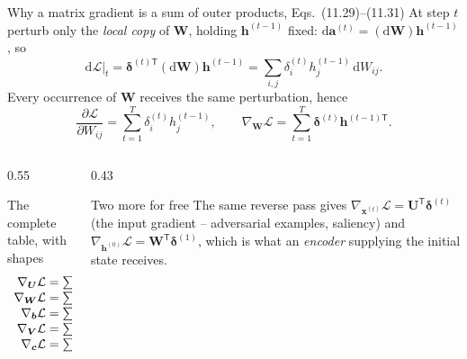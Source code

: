 \documentclass[10pt,aspectratio=169]{beamer}
\begin{document}
\begin{frame}{Why a matrix gradient is a sum of outer products, Eqs.~(11.29)--(11.31)}
\small
At step $t$ perturb only the \emph{local copy} of $\bm{W}$, holding
$\bm{h}^{(t-1)}$ fixed:
$\mathrm{d}\bm{a}^{(t)}=(\mathrm{d}\bm{W})\bm{h}^{(t-1)}$, so
\[
  \mathrm{d}\mathcal{L}\big|_{t}
  =\bm{\delta}^{(t)\mathsf{T}}(\mathrm{d}\bm{W})\bm{h}^{(t-1)}
  =\sum_{i,j}\delta^{(t)}_ih^{(t-1)}_j\,\mathrm{d}W_{ij}.
\]
Every occurrence of $\bm{W}$ receives the same perturbation, hence
\[
  \boxed{\;\frac{\partial\mathcal{L}}{\partial W_{ij}}=\sum_{t=1}^{T}\delta^{(t)}_ih^{(t-1)}_j,
  \qquad \nabla_{\bm{W}}\mathcal{L}=\sum_{t=1}^{T}\bm{\delta}^{(t)}\bm{h}^{(t-1)\mathsf{T}}.\;}
\]
\begin{columns}[T]
\begin{column}{0.55\textwidth}
\begin{block}{The complete table, with shapes}
\[
\begin{array}{r@{\;}c@{\;}l@{\quad}l}
\nabla_{\bm{U}}\mathcal{L}&=&\sum_t\bm{\delta}^{(t)}\bm{x}^{(t)\mathsf{T}} & n_h\times n_x\\
\nabla_{\bm{W}}\mathcal{L}&=&\sum_t\bm{\delta}^{(t)}\bm{h}^{(t-1)\mathsf{T}} & n_h\times n_h\\
\nabla_{\bm{b}}\mathcal{L}&=&\sum_t\bm{\delta}^{(t)} & n_h\\
\nabla_{\bm{V}}\mathcal{L}&=&\sum_t\bm{e}^{(t)}\bm{h}^{(t)\mathsf{T}} & n_y\times n_h\\
\nabla_{\bm{c}}\mathcal{L}&=&\sum_t\bm{e}^{(t)} & n_y
\end{array}
\]
\end{block}
\end{column}
\begin{column}{0.43\textwidth}
\begin{block}{Two more for free}
The same reverse pass gives
$\nabla_{\bm{x}^{(t)}}\mathcal{L}=\bm{U}^{\mathsf{T}}\bm{\delta}^{(t)}$
(the input gradient -- adversarial examples, saliency) and
$\nabla_{\bm{h}^{(0)}}\mathcal{L}=\bm{W}^{\mathsf{T}}\bm{\delta}^{(1)}$,
which is what an \emph{encoder} supplying the initial state receives.
\end{block}
\end{column}
\end{columns}
\end{frame}
\end{document}
